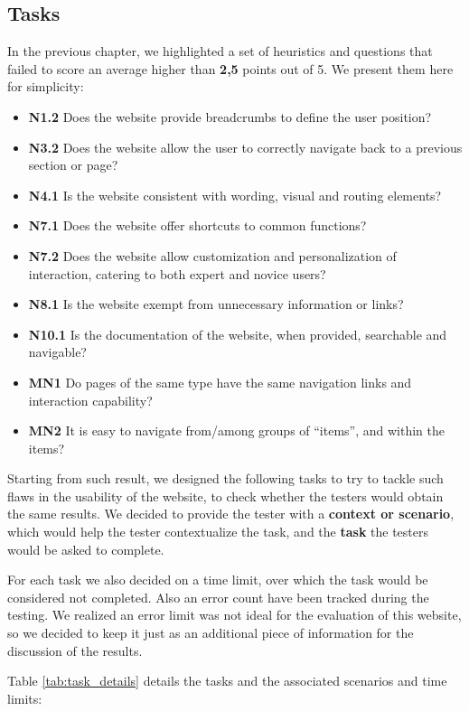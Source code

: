 \subsection{Tasks}
In the previous chapter, we highlighted a set of heuristics and questions that failed to score an average higher than \textbf{2,5} points out of 5. We present them here for simplicity:
\begin{itemize}
	\item \textbf{N1.2} Does the website provide breadcrumbs to define the user position?
	\item \textbf{N3.2} Does the website allow the user to correctly navigate back to a previous section or page?
	\item \textbf{N4.1} Is the website consistent with wording, visual and routing elements?
	\item \textbf{N7.1} Does the website offer shortcuts to common functions?
	\item \textbf{N7.2} Does the website allow customization and personalization of interaction, catering to both expert and novice users?
	\item \textbf{N8.1} Is the website exempt from unnecessary information or links?
	\item \textbf{N10.1} Is the documentation of the website, when provided, searchable and navigable?
	\item \textbf{MN1} Do pages of the same type have the same navigation links and interaction capability?
	\item \textbf{MN2} It is easy to navigate from/among groups of “items”, and within the items?
\end{itemize}

Starting from such result, we designed the following tasks to try to tackle such flaws in the usability of the website, to check whether the testers would obtain the same results. We decided to provide the tester with a \textbf{context or scenario}, which would help the tester contextualize the task, and the \textbf{task} the testers would be asked to complete.

For each task we also decided on a time limit, over which the task would be considered not completed. Also an error count have been tracked during the testing. We realized an error limit was not ideal for the evaluation of this website, so we decided to keep it just as an additional piece of information for the discussion of the results.

Table \ref{tab:task_details} details the tasks and the associated scenarios and time limits:

